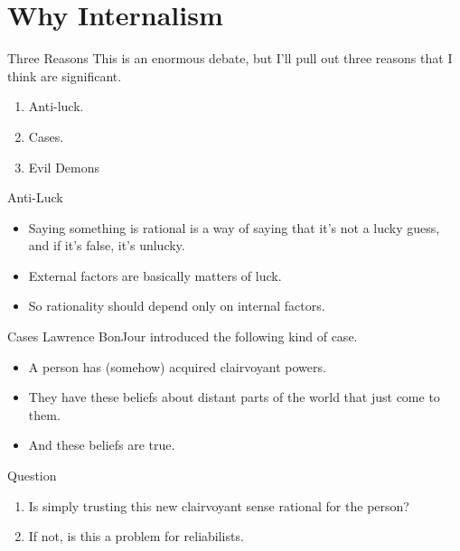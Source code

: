 \documentclass[
  17pt,
  letterpaper,
  ignorenonframetext,
  aspectratio=169,
]{beamer}
\providecommand{\tightlist}{%
  \setlength{\itemsep}{0pt}\setlength{\parskip}{0pt}}\usepackage{longtable,booktabs,array}
\begin{document}
\hypertarget{why-internalism}{%
\section{Why Internalism}\label{why-internalism}}

\begin{frame}{Three Reasons}
\protect\hypertarget{three-reasons}{}
This is an enormous debate, but I'll pull out three reasons that I think
are significant.

\begin{enumerate}[<+->]
\tightlist
\item
  Anti-luck.
\item
  Cases.
\item
  Evil Demons
\end{enumerate}
\end{frame}

\begin{frame}{Anti-Luck}
\protect\hypertarget{anti-luck}{}
\begin{itemize}[<+->]
\tightlist
\item
  Saying something is rational is a way of saying that it's not a lucky
  guess, and if it's false, it's unlucky.
\item
  External factors are basically matters of luck.
\item
  So rationality should depend only on internal factors.
\end{itemize}
\end{frame}

\begin{frame}{Cases}
\protect\hypertarget{cases}{}
Lawrence BonJour introduced the following kind of case.

\begin{itemize}[<+->]
\tightlist
\item
  A person has (somehow) acquired clairvoyant powers.
\item
  They have these beliefs about distant parts of the world that just
  come to them.
\item
  And these beliefs are true.
\end{itemize}
\end{frame}

\begin{frame}{Question}
\protect\hypertarget{question}{}
\begin{enumerate}[<+->]
\tightlist
\item
  Is simply trusting this new clairvoyant sense rational for the person?
\item
  If not, is this a problem for reliabilists.
\end{enumerate}
\end{frame}
\end{document}
